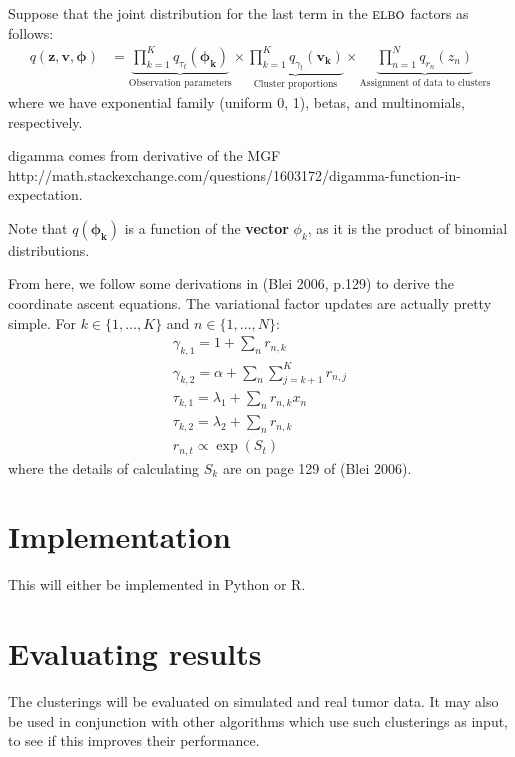 \documentclass[11pt]{article}
\newcommand{\bz}{\ensuremath{\mathbf{z}}}
\newcommand{\ELBO}{\textsc{elbo}}
\begin{document}
 Suppose that the joint distribution for the last term in the $\ELBO$ factors as follows:
\begin{align}
    q(\bz, \mathbf{v}, \mathbf{\phi}) &=
\underbrace{\prod\limits_{k=1}^K q_{\tau_t}(\mathbf{\phi_k})}_{\text{Observation parameters}} \times
 \underbrace{\prod\limits_{k=1}^K q_{\gamma_t}(\mathbf{v_k})}_{\text{Cluster proportions}} \times
 \underbrace{\prod\limits_{n=1}^{N} q_{r_n}(z_n)}_{\text{Assignment of data to clusters}} \nonumber
\end{align}
 where we have exponential family (uniform 0, 1), betas, and multinomials, respectively. 
 
 digamma comes from derivative of the MGF http://math.stackexchange.com/questions/1603172/digamma-function-in-expectation.
 
 Note that $q(\mathbf{\phi_k})$ is a function of the \textbf{vector} $\phi_k$, as it is the product of binomial distributions. 
 
 From here, we follow some derivations in (Blei 2006, p.129) to derive the coordinate ascent equations. The variational factor updates are actually pretty simple. For $k \in \{1, \ldots, K\}$ and $n \in \{1, \ldots, N\}$:
\begin{align}
\gamma_{k, 1} = 1 + \sum_n r_{n, k} \tag{These are the stick-breaking betas} \\
\gamma_{k, 2} = 	\alpha + \sum_n \sum_{j= k + 1}^K r_{n, j} \tag{This is also for the stick-breaking betas} \\
\tau_{k, 1} = \lambda_1 + \sum_n r_{n, k} x_n \tag{Look at exp defn on p125, this is for the cluster parameter from the base dist} \\
\tau_{k, 2} = \lambda_2 + \sum_n r_{n, k} \tag{Also for the cluster parameter}\\
r_{n, t} \propto \exp(S_t) \tag{For the cluster assignments}
\end{align}
where the details of calculating $S_k$ are on page 129 of (Blei 2006). 

\section{Implementation}
This will either be implemented in Python or R.

\section{Evaluating results}

The clusterings will be evaluated on simulated and real tumor data. It may also be used in conjunction with other algorithms which use such clusterings as input, to see if this improves their performance.
\end{document}
